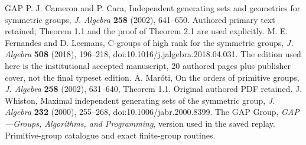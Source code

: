 \begin{thebibliography}{GAP}
 P. J. Cameron and P. Cara,
Independent generating sets and geometries for symmetric groups,
\emph{J. Algebra} \textbf{258} (2002), 641--650. Authored primary
text retained; Theorem 1.1 and the proof of Theorem 2.1 are used explicitly.
 M. E. Fernandes and D. Leemans,
C-groups of high rank for the symmetric groups,
\emph{J. Algebra} \textbf{508} (2018), 196--218,
doi:10.1016/j.jalgebra.2018.04.031.
The edition used here is the institutional accepted manuscript,
20 authored pages plus publisher cover, not the final typeset edition.
 A. Mar\'oti,
On the orders of primitive groups,
\emph{J. Algebra} \textbf{258} (2002), 631--640, Theorem 1.1.
Original authored PDF retained.
 J. Whiston,
Maximal independent generating sets of the symmetric group,
\emph{J. Algebra} \textbf{232} (2000), 255--268,
doi:10.1006/jabr.2000.8399.
 The GAP Group,
\emph{GAP---Groups, Algorithms, and Programming}, version used in the
saved replay. Primitive-group catalogue and exact finite-group routines.
\end{thebibliography}

